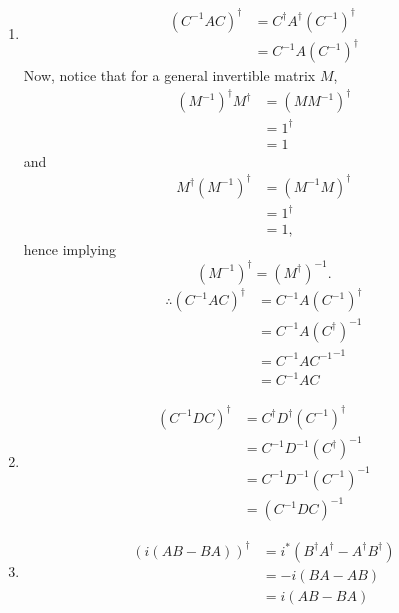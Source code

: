 \item

\begin{enumerate}[wide, labelindent = 0pt, label = (\alph*)]
\item
\begin{align*}
    {\left( C^{-1} A C \right)}^\dagger
    &= C^\dagger A^\dagger {\left( C^{-1} \right)}^\dagger \\
    &= C^{-1} A {\left( C^{-1} \right)}^\dagger
\end{align*}
Now, notice that for a general invertible matrix $M$,
\begin{align*}
    {\left( M^{-1} \right)}^\dagger M^\dagger
    &= {\left( M M^{-1} \right)}^\dagger \\
    &= 1^\dagger \\
    &= 1
\end{align*}
and
\begin{align*}
    M^\dagger {\left( M^{-1} \right)}^\dagger
    &= {\left( M^{-1} M \right)}^\dagger \\
    &= 1^\dagger \\
    &= 1,
\end{align*}
hence implying
\[
    {\left( M^{-1} \right)}^\dagger = {\left( M^\dagger \right)}^{-1}.
\]
\begin{align*}
    \therefore {\left( C^{-1} A C \right)}^\dagger
    &= C^{-1} A {\left( C^{-1} \right)}^\dagger \\
    &= C^{-1} A {\left( C^\dagger \right)}^{-1} \\
    &= C^{-1} A {C^{-1}}^{-1} \\
    &= C^{-1} A C
\end{align*}

\item
\begin{align*}
    {\left( C^{-1} D C \right)}^\dagger
    &= C^\dagger D^\dagger {\left( C^{-1} \right)}^\dagger \\
    &= C^{-1} D^{-1} {\left( C^\dagger \right)}^{-1} \\
    &= C^{-1} D^{-1} {\left( C^{-1} \right)}^{-1} \\
    &= {\left( C^{-1} D C \right)}^{-1}
\end{align*}

\item
\begin{align*}
    {\left( i (AB - BA) \right)}^\dagger
    &= i^* \left( B^\dagger A^\dagger - A^\dagger B^\dagger \right) \\
    &= -i (BA - AB) \\
    &= i (AB - BA)
\end{align*}

\end{enumerate}

